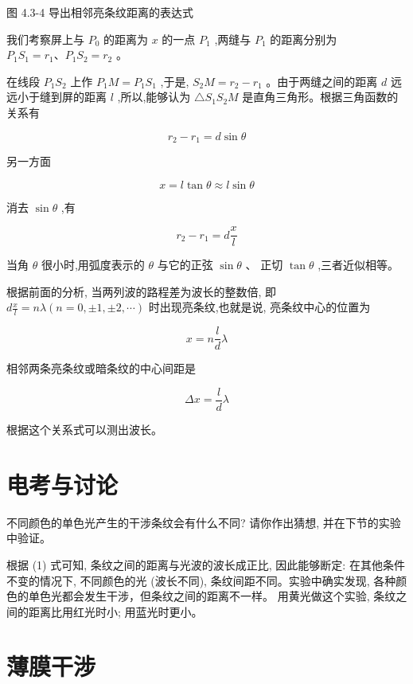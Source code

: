 \documentclass[10pt]{article}
\begin{document}
图 4.3-4 导出相邻亮条纹距离的表达式

我们考察屏上与 \({P}_{0}\) 的距离为 \(x\) 的一点 \({P}_{1}\) ,两缝与 \({P}_{1}\) 的距离分别为 \({P}_{1}{S}_{1} = {r}_{1}\text{、}{P}_{1}{S}_{2} = {r}_{2}\) 。

在线段 \({P}_{1}{S}_{2}\) 上作 \({P}_{1}M = {P}_{1}{S}_{1}\) ,于是, \({S}_{2}M = {r}_{2} - {r}_{1}\) 。由于两缝之间的距离 \(d\) 远远小于缝到屏的距离 \(l\) ,所以,能够认为 \(\bigtriangleup {S}_{1}{S}_{2}M\) 是直角三角形。根据三角函数的关系有

\[
{r}_{2} - {r}_{1} = d\sin \theta
\]

另一方面

\[
x = l\tan \theta \approx l\sin \theta
\]

消去 \(\sin \theta\) ,有

\[
{r}_{2} - {r}_{1} = d\frac{x}{l}
\]

\begin{mdframed}

当角 \(\theta\) 很小时,用弧度表示的 \(\theta\) 与它的正弦 \(\sin \theta\) 、 正切 \(\tan \theta\) ,三者近似相等。

\end{mdframed}

根据前面的分析, 当两列波的路程差为波长的整数倍, 即 \(d\frac{x}{l} = {n\lambda }\left( {n = 0, \pm 1, \pm 2,\cdots }\right)\) 时出现亮条纹,也就是说, 亮条纹中心的位置为

\[
x = n\frac{l}{d}\lambda
\]

相邻两条亮条纹或暗条纹的中心间距是

\[
{\Delta x} = \frac{l}{d}\lambda \tag{1}
\]

根据这个关系式可以测出波长。

\section*{电考与讨论}

不同颜色的单色光产生的干涉条纹会有什么不同? 请你作出猜想, 并在下节的实验中验证。

根据 (1) 式可知, 条纹之间的距离与光波的波长成正比, 因此能够断定: 在其他条件不变的情况下, 不同颜色的光 (波长不同), 条纹间距不同。实验中确实发现, 各种颜色的单色光都会发生干涉，但条纹之间的距离不一样。 用黄光做这个实验, 条纹之间的距离比用红光时小; 用蓝光时更小。

\section*{薄膜干涉}
\end{document}
